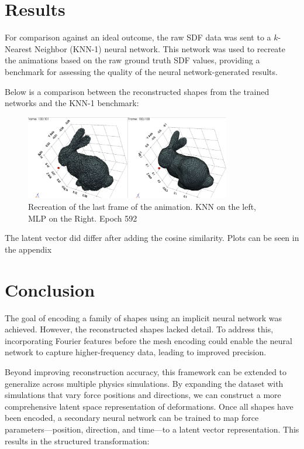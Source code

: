 \documentclass[a4paper,12pt]{article}
\begin{document}
\newpage
\pagebreak
\section*{Results}

For comparison against an ideal outcome, the raw SDF data was sent to a \( k\)-Nearest Neighbor (KNN-1) neural network. This network was used to recreate the animations based on the raw ground truth SDF values, providing a benchmark for assessing the quality of the neural network-generated results.

Below is a comparison between the reconstructed shapes from the trained networks and the KNN-1 benchmark:

\begin{figure}[h!]
	\centering
	\includegraphics[width=0.8\textwidth]{proj/6-recreation-comparaison.png}
	\caption{Recreation of the last frame of the animation. KNN on the left, MLP on the Right. Epoch 592}
	\label{fig:recreation-comparaison}
\end{figure}

The latent vector did differ after adding the cosine similarity. Plots can be seen in the appendix

\newpage
\pagebreak

\section*{Conclusion}

The goal of encoding a family of shapes using an implicit neural network was achieved. However, the reconstructed shapes lacked detail. To address this, incorporating Fourier features before the mesh encoding could enable the neural network to capture higher-frequency data, leading to improved precision.

Beyond improving reconstruction accuracy, this framework can be extended to generalize across multiple physics simulations. By expanding the dataset with simulations that vary force positions and directions, we can construct a more comprehensive latent space representation of deformations. Once all shapes have been encoded, a secondary neural network can be trained to map force parameters—position, direction, and time—to a latent vector representation. This results in the structured transformation:
\end{document}
